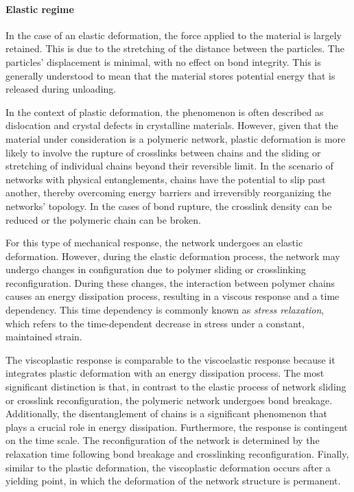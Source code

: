 \paragraph{Elastic regime} 
In the case of an elastic deformation, the force applied to the material is largely retained.
This is due to the stretching of the distance between the particles.
The particles' displacement is minimal, with no effect on bond integrity.
This is generally understood to mean that the material stores potential energy that is released during unloading.

In the context of plastic deformation, the phenomenon is often described as dislocation and crystal defects in crystalline materials.
However, given that the material under consideration is a polymeric network, plastic deformation is more likely to involve the rupture of crosslinks between chains and the sliding or stretching of individual chains beyond their reversible limit.
In the scenario of networks with physical entanglements, chains have the potential to slip past another, thereby overcoming energy barriers and irreversibly reorganizing the networks' topology.
In the cases of bond rupture, the crosslink density can be reduced or the polymeric chain can be broken.

For this type of mechanical response, the network undergoes an elastic deformation.
However, during the elastic deformation process, the network may undergo changes in configuration due to polymer sliding or crosslinking reconfiguration.
During these changes, the interaction between polymer chains causes an energy dissipation process, resulting in a viscous response and a time dependency.
This time dependency is commonly known as \textit{stress relaxation}, which refers to the time-dependent decrease in stress under a constant, maintained strain.

The viscoplastic response is comparable to the viscoelastic response because it integrates plastic deformation with an energy dissipation process.
The most significant distinction is that, in contrast to the elastic process of network sliding or crosslink reconfiguration, the polymeric network undergoes bond breakage.
Additionally, the disentanglement of chains is a significant phenomenon that plays a crucial role in energy dissipation.
Furthermore, the response is contingent on the time scale. 
The reconfiguration of the network is determined by the relaxation time following bond breakage and crosslinking reconfiguration.
Finally, similar to the plastic deformation, the viscoplastic deformation occurs after a yielding point, in which the deformation of the network structure is permanent.


